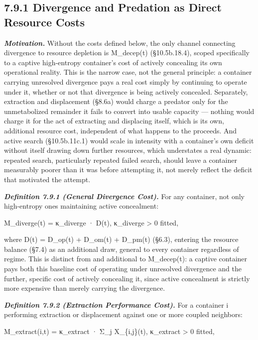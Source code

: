 \documentclass[
]{article}
\begin{document}
\hypertarget{divergence-and-predation-as-direct-resource-costs}{%
\subsection{7.9.1 Divergence and Predation as Direct Resource
Costs}\label{divergence-and-predation-as-direct-resource-costs}}

\emph{\textbf{Motivation.}} Without the costs defined below, the only
channel connecting divergence to resource depletion is M\_decep(t)
(§10.5b.18.4), scoped specifically to a captive high-entropy container's
cost of actively concealing its own operational reality. This is the
narrow case, not the general principle: a container carrying unresolved
divergence pays a real cost simply by continuing to operate under it,
whether or not that divergence is being actively concealed. Separately,
extraction and displacement (§8.6a) would charge a predator only for the
unmetabolized remainder it fails to convert into usable capacity ---
nothing would charge it for the act of extracting and displacing itself,
which is its own, additional resource cost, independent of what happens
to the proceeds. And active search (§10.5b.11c.1) would scale in
intensity with a container's own deficit without itself drawing down
further resources, which understates a real dynamic: repeated search,
particularly repeated failed search, should leave a container measurably
poorer than it was before attempting it, not merely reflect the deficit
that motivated the attempt.

\emph{\textbf{Definition 7.9.1 (General Divergence Cost).}} For any
container, not only high-entropy ones maintaining active concealment:

M\_diverge(t) = κ\_diverge · D(t), κ\_diverge \textgreater{} 0 fitted,

where D(t) = D\_op(t) + D\_om(t) + D\_pm(t) (§6.3), entering the
resource balance (§7.4) as an additional draw, general to every
container regardless of regime. This is distinct from and additional to
M\_decep(t): a captive container pays both this baseline cost of
operating under unresolved divergence and the further, specific cost of
actively concealing it, since active concealment is strictly more
expensive than merely carrying the divergence.

\emph{\textbf{Definition 7.9.2 (Extraction Performance Cost).}} For a
container i performing extraction or displacement against one or more
coupled neighbors:

M\_extract(i,t) = κ\_extract · Σ\_j X\_\{i,j\}(t), κ\_extract
\textgreater{} 0 fitted,
\end{document}
